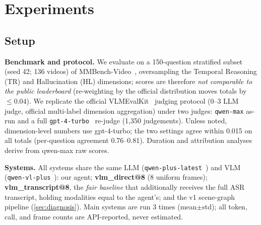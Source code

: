 
\section{Experiments}
\label{sec:eval}

\subsection{Setup}
\label{subsec:exp-setup}

\textbf{Benchmark and protocol.} We evaluate on a 150-question stratified subset
(seed 42; 136 videos) of MMBench-Video~\cite{fang2024mmbenchvideo}, oversampling
the Temporal Reasoning (TR) and Hallucination (HL) dimensions; scores are therefore
\emph{not comparable to the public leaderboard} (re-weighting by the official
distribution moves totals by $\leq 0.04$). We replicate the official
VLMEvalKit~\cite{duan2024vlmevalkit} judging protocol (0--3 LLM judge, official
multi-label dimension aggregation) under two judges: \texttt{qwen-max} as-run and
a full \texttt{gpt-4-turbo}~\cite{openai2023gpt4} re-judge (1{,}350 judgements).
Unless noted, dimension-level numbers use gpt-4-turbo; the two settings agree
within 0.015 on all totals (per-question agreement 0.76--0.81). Duration and
attribution analyses derive from qwen-max raw scores.

\textbf{Systems.} All systems share the same LLM
(\texttt{qwen-plus-latest}~\cite{bai2023qwen}) and VLM
(\texttt{qwen-vl-plus}~\cite{bai2023qwenvl}): our agent;
\textbf{vlm\_direct@8} (8 uniform frames); \textbf{vlm\_transcript@8}, the
\emph{fair baseline} that additionally receives the full ASR transcript, holding
modalities equal to the agent's; and the v1 scene-graph pipeline
(\cref{sec:diagnosis}). Main systems are run 3 times (mean$\pm$std); all token,
call, and frame counts are API-reported, never estimated.

